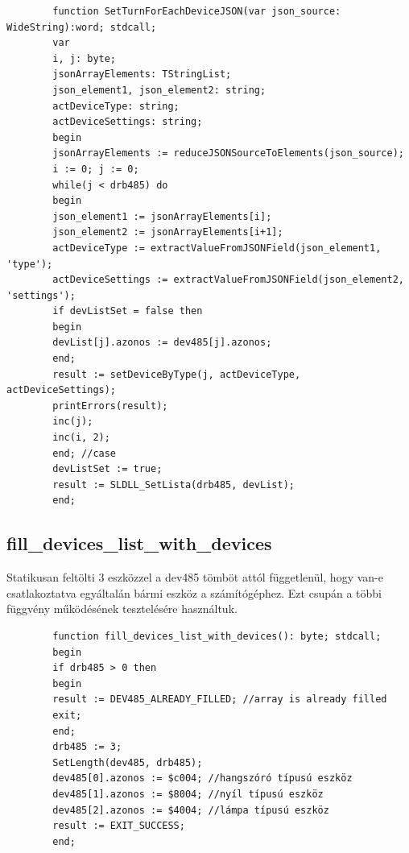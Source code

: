 \documentclass[tocnopagenum]{thesis-ekf}
\begin{document}
	\begin{verbatim}
		function SetTurnForEachDeviceJSON(var json_source: WideString):word; stdcall;
		var
		i, j: byte;
		jsonArrayElements: TStringList;
		json_element1, json_element2: string;
		actDeviceType: string;
		actDeviceSettings: string;
		begin
		jsonArrayElements := reduceJSONSourceToElements(json_source);
		i := 0; j := 0;
		while(j < drb485) do
		begin
		json_element1 := jsonArrayElements[i];
		json_element2 := jsonArrayElements[i+1];
		actDeviceType := extractValueFromJSONField(json_element1, 'type'); 
		actDeviceSettings := extractValueFromJSONField(json_element2, 'settings');
		if devListSet = false then 
		begin
		devList[j].azonos := dev485[j].azonos; 
		end;
		result := setDeviceByType(j, actDeviceType, actDeviceSettings);
		printErrors(result);
		inc(j);
		inc(i, 2);
		end; //case
		devListSet := true;
		result := SLDLL_SetLista(drb485, devList);
		end;
	\end{verbatim}
	
	\subsection{fill\_devices\_list\_with\_devices} Statikusan feltölti 3 eszközzel a dev485 tömböt attól függetlenül, hogy van-e csatlakoztatva egyáltalán bármi eszköz a számítógéphez. Ezt csupán a többi függvény működésének tesztelésére használtuk.
	
	\begin{verbatim}
		function fill_devices_list_with_devices(): byte; stdcall;
		begin
		if drb485 > 0 then
		begin
		result := DEV485_ALREADY_FILLED; //array is already filled
		exit;
		end;
		drb485 := 3;
		SetLength(dev485, drb485);
		dev485[0].azonos := $c004; //hangszóró típusú eszköz
		dev485[1].azonos := $8004; //nyíl típusú eszköz
		dev485[2].azonos := $4004; //lámpa típusú eszköz
		result := EXIT_SUCCESS;
		end;
	\end{verbatim}
\end{document}

